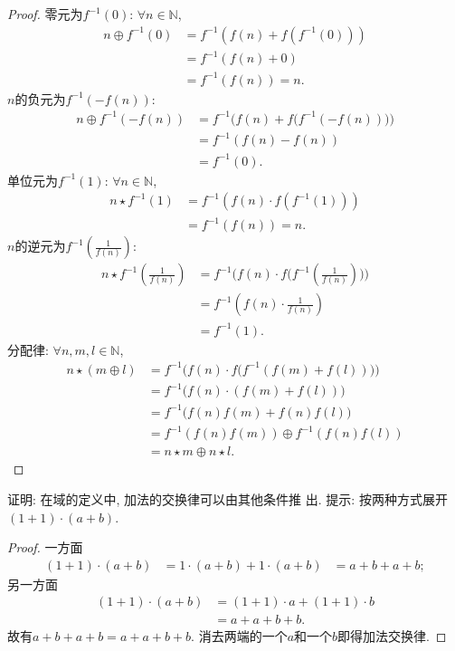 \begin{proof}
    零元为$f^{-1}(0)$: $\forall n \in \mathbb{N}$,
\[
\begin{aligned}
    n \oplus f^{-1}(0) &= f^{-1}(f(n) + f(f^{-1}(0)))\\
    &= f^{-1}(f(n) + 0)\\
    &= f^{-1}(f(n)) = n.
\end{aligned}
\]
    $n$的负元为$f^{-1}(-f(n))$:
\[
\begin{aligned}
    n \oplus f^{-1}(-f(n)) &= f^{-1}\biggl(f(n) + f\bigl(f^{-1}(-f(n))\bigr)\biggr)\\
    &= f^{-1}(f(n) - f(n))\\
    &= f^{-1}(0).
\end{aligned}
\]
    单位元为$f^{-1}(1)$: $\forall n \in \mathbb{N}$,
\[
\begin{aligned}
    n \star f^{-1}(1) &= f^{-1}(f(n) \cdot f(f^{-1}(1)))\\
    &= f^{-1}(f(n)) = n.
\end{aligned}
\]
    $n$的逆元为$f^{-1}(\frac1{f(n)})$:
\[
\begin{aligned}
    n \star f^{-1}(\frac{1}{f(n)}) &= f^{-1}\biggl(f(n) \cdot f\bigl(f^{-1}(\frac{1}{f(n)})\bigr)\biggr)\\
    &= f^{-1}(f(n) \cdot \frac{1}{f(n)})\\
    &= f^{-1}(1).
\end{aligned}
\]
    分配律: $\forall n, m, l \in \mathbb{N}$,
\[
\begin{aligned}
    n \star (m \oplus l) &= f^{-1}\biggl(f(n) \cdot f\bigl(f^{-1}(f(m) + f(l))\bigr)\biggr)\\
    &= f^{-1}\bigl(f(n) \cdot (f(m) + f(l))\bigr)\\
    &= f^{-1}\bigl(f(n)f(m) + f(n)f(l)\bigr)\\
    &= f^{-1}(f(n)f(m)) \oplus f^{-1}(f(n)f(l))\\
    &= n \star m \oplus n \star l.
\end{aligned}
\]
\end{proof}

\begin{problem}\label{ex:1.1.5}
    证明: 在域的定义中, 加法的交换律可以由其他条件推
出. 提示: 按两种方式展开 $(1 + 1) \cdot (a + b)$.
\end{problem}

\begin{proof}
    一方面
\[
\begin{aligned}
    (1 + 1) \cdot (a + b) &= 1 \cdot (a + b) + 1 \cdot (a + b)
    &= a + b + a + b;
\end{aligned}    
\]
    另一方面
\[
\begin{aligned}
    (1 + 1) \cdot (a + b) &= (1 + 1) \cdot a + (1 + 1) \cdot b\\
    &= a + a + b + b.
\end{aligned}
\]
故有$a + b + a + b = a + a + b + b$.
消去两端的一个$a$和一个$b$即得加法交换律.
\end{proof}

